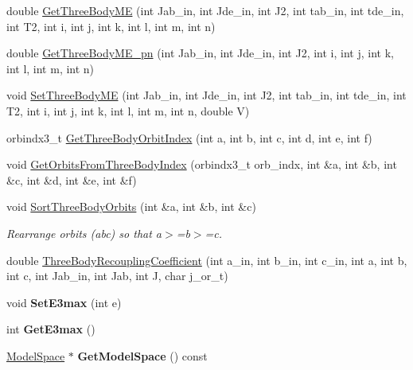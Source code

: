 \begin{DoxyCompactItemize}
\item 
double \hyperlink{classOperator_ab2f0275c25ffb0f04935cb9d6ea043e1}{Get\-Three\-Body\-M\-E} (int Jab\-\_\-in, int Jde\-\_\-in, int J2, int tab\-\_\-in, int tde\-\_\-in, int T2, int i, int j, int k, int l, int m, int n)
\item 
double \hyperlink{classOperator_a260213f7aa6bfb6eb17b11a08c136317}{Get\-Three\-Body\-M\-E\-\_\-pn} (int Jab\-\_\-in, int Jde\-\_\-in, int J2, int i, int j, int k, int l, int m, int n)
\item 
void \hyperlink{classOperator_a997b0b2df75089a9e910c19410ebd8db}{Set\-Three\-Body\-M\-E} (int Jab\-\_\-in, int Jde\-\_\-in, int J2, int tab\-\_\-in, int tde\-\_\-in, int T2, int i, int j, int k, int l, int m, int n, double V)
\item 
orbindx3\-\_\-t \hyperlink{classOperator_a78c235a23140618f76e5d17e2afc4582}{Get\-Three\-Body\-Orbit\-Index} (int a, int b, int c, int d, int e, int f)
\item 
void \hyperlink{classOperator_aaa9163ed47bb4c3330c58fcab09d4cae}{Get\-Orbits\-From\-Three\-Body\-Index} (orbindx3\-\_\-t orb\-\_\-indx, int \&a, int \&b, int \&c, int \&d, int \&e, int \&f)
\item 
\hypertarget{classOperator_a3633fb9e34c473ce0389ebe073157171}{void \hyperlink{classOperator_a3633fb9e34c473ce0389ebe073157171}{Sort\-Three\-Body\-Orbits} (int \&a, int \&b, int \&c)}\label{classOperator_a3633fb9e34c473ce0389ebe073157171}

\begin{DoxyCompactList}\small\item\em Rearrange orbits (abc) so that a$>$=b$>$=c. \end{DoxyCompactList}\item 
double \hyperlink{classOperator_a894e29959b3f7b2008c4442683bf8642}{Three\-Body\-Recoupling\-Coefficient} (int a\-\_\-in, int b\-\_\-in, int c\-\_\-in, int a, int b, int c, int Jab\-\_\-in, int Jab, int J, char j\-\_\-or\-\_\-t)
\item 
\hypertarget{classOperator_a8b32ed75e5e0d6175a2f2f517c63a89c}{void {\bfseries Set\-E3max} (int e)}\label{classOperator_a8b32ed75e5e0d6175a2f2f517c63a89c}

\item 
\hypertarget{classOperator_a42d67df774701e40e2c49e539a68c937}{int {\bfseries Get\-E3max} ()}\label{classOperator_a42d67df774701e40e2c49e539a68c937}

\item 
\hypertarget{classOperator_a037a75a9f8a0dc970e56240552cc96d2}{\hyperlink{classModelSpace}{Model\-Space} $\ast$ {\bfseries Get\-Model\-Space} () const }\label{classOperator_a037a75a9f8a0dc970e56240552cc96d2}


\end{DoxyCompactItemize}
